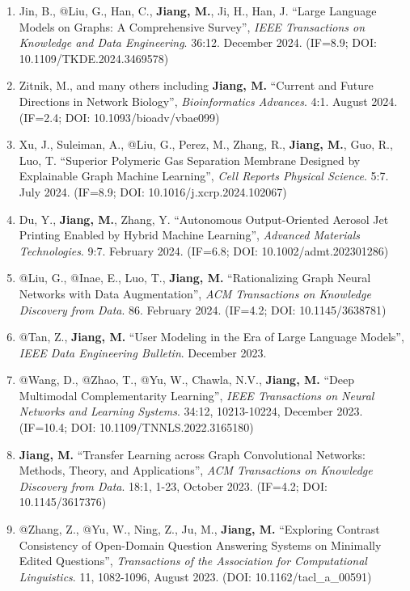 \documentclass[10pt]{article}
\newenvironment{myindentpar}[1]%
{\begin{list}{}%
         {\setlength{\leftmargin}{#1}}%
         \item[]%
}
{\end{list}}
\newcounter{list}
\begin{document}
\begin{myindentpar}{0.00cm}
\begin{enumerate}[leftmargin=.5cm]
\item[J42] Jin, B., @Liu, G., Han, C., \textbf{Jiang, M.}, Ji, H., Han, J. ``Large Language Models on Graphs: A Comprehensive Survey'', \textit{IEEE Transactions on Knowledge and Data Engineering}. 36:12. December 2024. (IF=8.9; DOI: 10.1109/TKDE.2024.3469578)

\item[J41] Zitnik, M., and many others including \textbf{Jiang, M.} ``Current and Future Directions in Network Biology'', \textit{Bioinformatics Advances}. 4:1. August 2024. (IF=2.4; DOI: 10.1093/bioadv/vbae099)

\item[J40] Xu, J., Suleiman, A., @Liu, G., Perez, M., Zhang, R., \textbf{Jiang, M.}, Guo, R., Luo, T. ``Superior Polymeric Gas Separation Membrane Designed by Explainable Graph Machine Learning'', \textit{Cell Reports Physical Science}. 5:7. July 2024. (IF=8.9; DOI: 10.1016/j.xcrp.2024.102067)
	
\item[J39] Du, Y., \textbf{Jiang, M.}, Zhang, Y. ``Autonomous Output-Oriented Aerosol Jet Printing Enabled by Hybrid Machine Learning'', \textit{Advanced Materials Technologies}. 9:7. February 2024. (IF=6.8; DOI: 10.1002/admt.202301286)

\item[J38] @Liu, G., @Inae, E., Luo, T., \textbf{Jiang, M.} ``Rationalizing Graph Neural Networks with Data Augmentation'', \textit{ACM Transactions on Knowledge Discovery from Data}. 86. February 2024. (IF=4.2; DOI: 10.1145/3638781)

\item[J37] @Tan, Z., \textbf{Jiang, M.} ``User Modeling in the Era of Large Language Models'', \textit{IEEE Data Engineering Bulletin}. December 2023.

\item[J36] @Wang, D., @Zhao, T., @Yu, W., Chawla, N.V., \textbf{Jiang, M.} ``Deep Multimodal Complementarity Learning'', \textit{IEEE Transactions on Neural Networks and Learning Systems}. 34:12, 10213-10224, December 2023. (IF=10.4; DOI: 10.1109/TNNLS.2022.3165180)

\item[J35] \textbf{Jiang, M.} ``Transfer Learning across Graph Convolutional Networks: Methods, Theory, and Applications'', \textit{ACM Transactions on Knowledge Discovery from Data}. 18:1, 1-23, October 2023. (IF=4.2; DOI: 10.1145/3617376)

\item[J34] @Zhang, Z., @Yu, W., Ning, Z., Ju, M., \textbf{Jiang, M.} ``Exploring Contrast Consistency of Open-Domain Question Answering Systems on Minimally Edited Questions'', \textit{Transactions of the Association for Computational Linguistics}. 11, 1082-1096, August 2023. (DOI: 10.1162/tacl\_a\_00591)
	

\end{enumerate}
\end{myindentpar}
\end{document}
